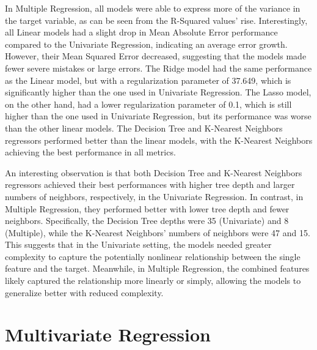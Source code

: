 In Multiple Regression, all models were able to express more of the variance in the target variable,
as can be seen from the R-Squared values' rise.
Interestingly, all Linear models had a slight drop in Mean Absolute Error performance compared to the
Univariate Regression, indicating an average error growth. However, their Mean Squared Error decreased,
suggesting that the models made fewer severe mistakes or large errors.
The Ridge model had the same performance as the Linear model, but with a regularization
parameter of 37.649, which is significantly higher than the one used in Univariate Regression.
The Lasso model, on the other hand, had a lower regularization parameter of 0.1, which is
still higher than the one used in Univariate Regression, but its performance was worse than the other
linear models.
The Decision Tree and K-Nearest Neighbors regressors performed better than the linear models,
with the K-Nearest Neighbors achieving the best performance in all metrics.

An interesting observation is that both Decision Tree and K-Nearest Neighbors regressors achieved their
best performances with higher tree depth and larger numbers of neighbors, respectively, in the
Univariate Regression. In contrast, in Multiple Regression, they performed better with lower tree depth
and fewer neighbors. Specifically, the Decision Tree depths were 35 (Univariate) and 8 (Multiple),
while the K-Nearest Neighbors' numbers of neighbors were 47 and 15. This suggests that in the
Univariate setting, the models needed greater complexity to capture the potentially nonlinear
relationship between the single feature and the target. Meanwhile, in Multiple Regression, the
combined features likely captured the relationship more linearly or simply, allowing the models to
generalize better with reduced complexity.



\section{Multivariate Regression}
